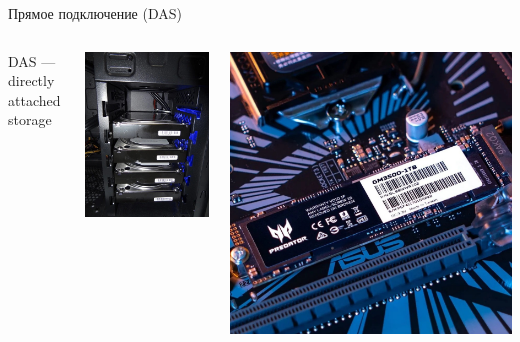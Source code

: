 \documentclass[aspectratio=169]{beamer}
\begin{document}
\begin{frame}{Прямое подключение (DAS)}
\begin{columns}[T]
    \begin{column}{.2\textwidth}
        DAS --- directly attached storage
        \dma
    \end{column}
    \begin{column}{.3\textwidth}
    \includegraphics[scale=0.3]{fig/3.hdd.jpg}
    \end{column}
    \begin{column}{.4\textwidth}
        \includegraphics[scale=0.166]{fig/4.nvme.jpg}

\end{column}
\end{columns}
\end{frame}
\end{document}
